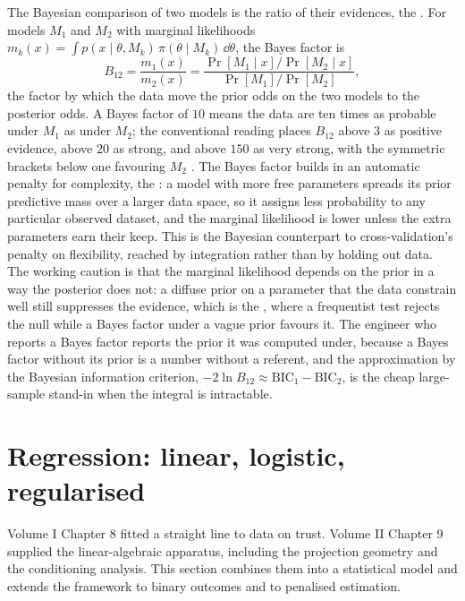 \begin{mastery}
The Bayesian comparison of two models is the ratio of their
evidences, the . For models $M_{1}$ and
$M_{2}$ with marginal likelihoods $m_{k}(x) = \int p(x \mid \theta,
M_{k})\, \pi(\theta \mid M_{k})\, \dd\theta$, the Bayes factor is
\[
B_{12} = \frac{m_{1}(x)}{m_{2}(x)}
= \frac{\Pr[M_{1} \mid x]/\Pr[M_{2} \mid x]}
       {\Pr[M_{1}]/\Pr[M_{2}]},
\]
the factor by which the data move the prior odds on the two models to
the posterior odds. A Bayes factor of $10$ means the data are ten
times as probable under $M_{1}$ as under $M_{2}$; the conventional
reading places $B_{12}$ above $3$ as positive evidence, above $20$ as
strong, and above $150$ as very strong, with the symmetric brackets
below one favouring $M_{2}$ \cite{text:wasserman2004}. The Bayes
factor builds in an automatic penalty for complexity, the
: a model with more free parameters
spreads its prior predictive mass over a larger data space, so it
assigns less probability to any particular observed dataset, and the
marginal likelihood is lower unless the extra parameters earn their
keep. This is the Bayesian counterpart to cross-validation's penalty
on flexibility, reached by integration rather than by holding out
data. The working caution is that the marginal likelihood depends on
the prior in a way the posterior does not: a diffuse prior on a
parameter that the data constrain well still suppresses the evidence,
which is the , where a frequentist
test rejects the null while a Bayes factor under a vague prior favours
it. The engineer who reports a Bayes factor reports the prior it was
computed under, because a Bayes factor without its prior is a number
without a referent, and the approximation by the Bayesian information
criterion, $-2\ln B_{12} \approx \mathrm{BIC}_{1} - \mathrm{BIC}_{2}$,
is the cheap large-sample stand-in when the integral is intractable.
\end{mastery}

\section{Regression: linear, logistic, regularised}

Volume I Chapter 8 fitted a straight line to data on trust. Volume
II Chapter 9 supplied the linear-algebraic apparatus, including the
projection geometry and the conditioning analysis. This section
combines them into a statistical model and extends the framework to
binary outcomes and to penalised estimation.

